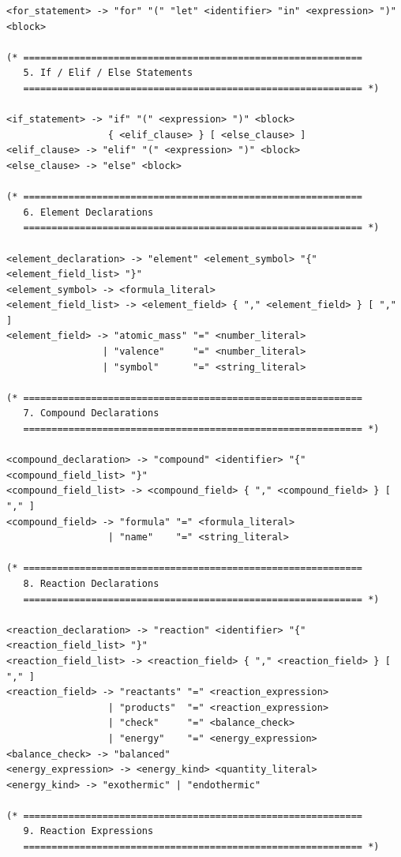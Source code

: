 \documentclass[11pt,a4paper]{article}
\begin{document}
\begin{lstlisting}[style=ebnf]
<for_statement> -> "for" "(" "let" <identifier> "in" <expression> ")" <block>

(* ============================================================
   5. If / Elif / Else Statements
   ============================================================ *)

<if_statement> -> "if" "(" <expression> ")" <block>
                  { <elif_clause> } [ <else_clause> ]
<elif_clause> -> "elif" "(" <expression> ")" <block>
<else_clause> -> "else" <block>

(* ============================================================
   6. Element Declarations
   ============================================================ *)

<element_declaration> -> "element" <element_symbol> "{" <element_field_list> "}"
<element_symbol> -> <formula_literal>
<element_field_list> -> <element_field> { "," <element_field> } [ "," ]
<element_field> -> "atomic_mass" "=" <number_literal>
                 | "valence"     "=" <number_literal>
                 | "symbol"      "=" <string_literal>

(* ============================================================
   7. Compound Declarations
   ============================================================ *)

<compound_declaration> -> "compound" <identifier> "{" <compound_field_list> "}"
<compound_field_list> -> <compound_field> { "," <compound_field> } [ "," ]
<compound_field> -> "formula" "=" <formula_literal>
                  | "name"    "=" <string_literal>

(* ============================================================
   8. Reaction Declarations
   ============================================================ *)

<reaction_declaration> -> "reaction" <identifier> "{" <reaction_field_list> "}"
<reaction_field_list> -> <reaction_field> { "," <reaction_field> } [ "," ]
<reaction_field> -> "reactants" "=" <reaction_expression>
                  | "products"  "=" <reaction_expression>
                  | "check"     "=" <balance_check>
                  | "energy"    "=" <energy_expression>
<balance_check> -> "balanced"
<energy_expression> -> <energy_kind> <quantity_literal>
<energy_kind> -> "exothermic" | "endothermic"

(* ============================================================
   9. Reaction Expressions
   ============================================================ *)


\end{lstlisting}
\end{document}
